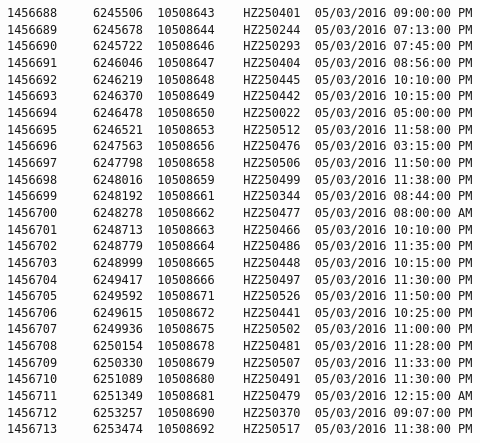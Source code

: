 \documentclass[11pt]{article}
\begin{document}
\begin{Verbatim}[commandchars=\\\{\}]
1456688     6245506  10508643    HZ250401  05/03/2016 09:00:00 PM   
1456689     6245678  10508644    HZ250244  05/03/2016 07:13:00 PM   
1456690     6245722  10508646    HZ250293  05/03/2016 07:45:00 PM   
1456691     6246046  10508647    HZ250404  05/03/2016 08:56:00 PM   
1456692     6246219  10508648    HZ250445  05/03/2016 10:10:00 PM   
1456693     6246370  10508649    HZ250442  05/03/2016 10:15:00 PM   
1456694     6246478  10508650    HZ250022  05/03/2016 05:00:00 PM   
1456695     6246521  10508653    HZ250512  05/03/2016 11:58:00 PM   
1456696     6247563  10508656    HZ250476  05/03/2016 03:15:00 PM   
1456697     6247798  10508658    HZ250506  05/03/2016 11:50:00 PM   
1456698     6248016  10508659    HZ250499  05/03/2016 11:38:00 PM   
1456699     6248192  10508661    HZ250344  05/03/2016 08:44:00 PM   
1456700     6248278  10508662    HZ250477  05/03/2016 08:00:00 AM   
1456701     6248713  10508663    HZ250466  05/03/2016 10:10:00 PM   
1456702     6248779  10508664    HZ250486  05/03/2016 11:35:00 PM   
1456703     6248999  10508665    HZ250448  05/03/2016 10:15:00 PM   
1456704     6249417  10508666    HZ250497  05/03/2016 11:30:00 PM   
1456705     6249592  10508671    HZ250526  05/03/2016 11:50:00 PM   
1456706     6249615  10508672    HZ250441  05/03/2016 10:25:00 PM   
1456707     6249936  10508675    HZ250502  05/03/2016 11:00:00 PM   
1456708     6250154  10508678    HZ250481  05/03/2016 11:28:00 PM   
1456709     6250330  10508679    HZ250507  05/03/2016 11:33:00 PM   
1456710     6251089  10508680    HZ250491  05/03/2016 11:30:00 PM   
1456711     6251349  10508681    HZ250479  05/03/2016 12:15:00 AM   
1456712     6253257  10508690    HZ250370  05/03/2016 09:07:00 PM   
1456713     6253474  10508692    HZ250517  05/03/2016 11:38:00 PM   


\end{Verbatim}
\end{document}
